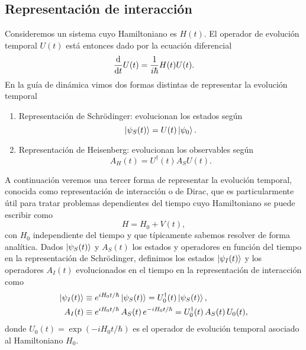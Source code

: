\documentclass[10pt, a4paper]{article}
\numberwithin{equation}{subsection}
\begin{document}
\subsection{Representación de interacción}
Consideremos un sistema cuyo Hamiltoniano es $H(t)$. El operador de evolución
temporal $U(t)$ está entonces dado por la ecuación diferencial
\begin{equation} \label{eqdiff:optevol}
  \dv{t}U(t) = \frac{1}{i\hbar}H(t)U(t).
\end{equation}
En la guía de dinámica vimos dos formas distintas de representar la evolución
temporal
\begin{enumerate}
  \item Representación de Schrödinger: evolucionan los estados según
    \begin{equation} \label{def:statesch}
      \ket{\psi_S(t)} = U(t)\ket{\psi_0}.
    \end{equation}
  \item Representación de Heisenberg: evolucionan los observables según
    \begin{equation} \label{def:opheis}
      A_{H}(t) = U^\dagger(t)A_{S}U(t).
    \end{equation}
\end{enumerate}
A continuación veremos una tercer forma de representar la evolución temporal,
conocida como representación de interacción o de Dirac, que es particularmente
útil para tratar problemas dependientes del tiempo cuyo Hamiltoniano se puede
escribir como
\begin{equation} \label{eq:hfactpint}
  H = H_0 + V(t),
\end{equation}
con $H_0$ independiente del tiempo y que típicamente sabemos resolver de forma
analítica. Dados $\ket{\psi_S(t)}$ y $A_{S}(t)$ los estados y operadores en
función del tiempo en la representación de Schrödinger, definimos los estados
$\ket{\psi_I(t)}$ y los operadores $A_I(t)$ evolucionados en el tiempo en la
representación de interacción como
\begin{align}
  \ket{\psi_I(t)} &\equiv e^{iH_0t/\hbar}\ket{\psi_S(t)} =
    U^\dagger_0(t)\ket{\psi_S(t)}, \label{def:stateint} \\
  A_{I}(t) &\equiv e^{iH_0t/\hbar}\,A_{S}(t)\,e^{-iH_0t/\hbar} =
    U^\dagger_0(t)\,A_{S}(t)\,U_0(t), \label{def:opint}
\end{align}
donde $U_0(t) = \exp\left(-iH_0t/\hbar\right)$ es el operador de evolución
temporal asociado al Hamiltoniano $H_0$.
\end{document}

